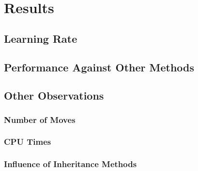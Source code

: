 \documentclass[12pt,a4paper]{article}
\begin{document}
    
\section{Results}
    
    
    \subsection{Learning Rate}
    \subsection{Performance Against Other Methods}
    \subsection{Other Observations}
        \subsubsection{Number of Moves}
        \subsubsection{CPU Times}
        \subsubsection{Influence of Inheritance Methods}
\end{document}
